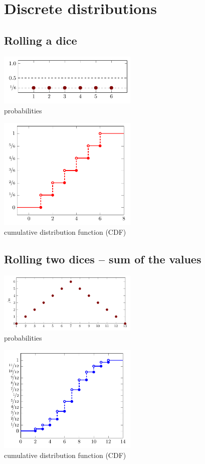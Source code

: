 \documentclass[a4paper]{article}
\begin{document}
	
	\section{Discrete distributions}
	\subsection{Rolling a dice}
		\begin{multicols}{2}
			\centering
			\includegraphics[width=0.5\textwidth]{Dice_single_probability}\\
			probabilities 

			\includegraphics[width=0.5\textwidth]{Dice_single_CDF}\\
			cumulative distribution function (CDF)				
		\end{multicols}
	
	\subsection{Rolling two dices -- sum of the values}
		\begin{multicols}{2}
			\centering
			\includegraphics[width=0.5\textwidth]{Dice_double_probability}\\
			probabilities
			
			\includegraphics[width=0.5\textwidth]{Dice_double_CDF}\\
			cumulative distribution function (CDF)
		\end{multicols}
\end{document}
